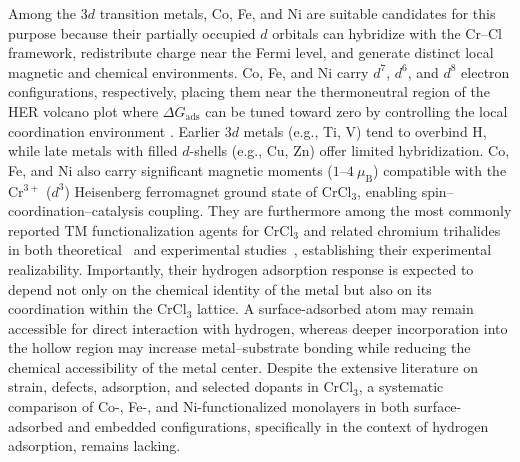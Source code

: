 \documentclass[journal=jacsat,manuscript=article]{achemso}
\begin{document}
Among the $3d$ transition metals, Co, Fe, and Ni are suitable candidates for this purpose because their partially occupied $d$ orbitals can hybridize with the Cr--Cl framework, redistribute charge near the Fermi level, and generate distinct local magnetic and chemical environments. {\color{revcolor}%
  Co, Fe, and Ni carry $d^7$, $d^6$, and $d^8$ electron configurations, respectively, placing them near the thermoneutral region of the HER volcano plot where $\Delta G_{\mathrm{ads}}$ can be tuned toward zero by controlling the local coordination environment \cite{Norskov_2005,Moraes2026}. Earlier $3d$ metals (e.g., Ti, V) tend to overbind H, while late metals with filled $d$-shells (e.g., Cu, Zn) offer limited hybridization. Co, Fe, and Ni also carry significant magnetic moments ($1$--$4~\mu_{\mathrm{B}}$) compatible with the Cr$^{3+}$ ($d^3$) Heisenberg ferromagnet ground state of CrCl$_3$, enabling spin--coordination--catalysis coupling. They are furthermore among the most commonly reported TM functionalization agents for CrCl$_3$ and related chromium trihalides in both theoretical~\cite{Luo2020,Gao2018} and experimental studies~\cite{Mastrippolito2021,Abdel-Hafiez2025}, establishing their experimental realizability.
} Importantly, their hydrogen adsorption response is expected to depend not only on the chemical identity of the metal but also on its coordination within the CrCl$_3$ lattice. A surface-adsorbed atom may remain accessible for direct interaction with hydrogen, whereas deeper incorporation into the hollow region may increase metal--substrate bonding while reducing the chemical accessibility of the metal center. Despite the extensive literature on strain, defects, adsorption, and selected dopants in CrCl$_3$, a systematic comparison of Co-, Fe-, and Ni-functionalized monolayers in both surface-adsorbed and embedded configurations, specifically in the context of hydrogen adsorption, remains lacking.
\end{document}
